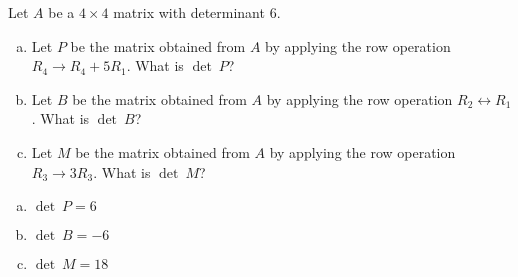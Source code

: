 
\begin{exerciseStatement}


Let \(A\) be a \(4 \times 4\) matrix with determinant \( 6 \).


\begin{enumerate}[(a)]
\item Let \(P\) be the matrix obtained from \(A\) by applying the row operation \( R_4 \to R_4 + 5R_1 \). What is \(\operatorname{det}\ P\)?
\item Let \(B\) be the matrix obtained from \(A\) by applying the row operation \( R_2 \leftrightarrow R_1 \). What is \(\operatorname{det}\ B\)?
\item Let \(M\) be the matrix obtained from \(A\) by applying the row operation \( R_3 \to 3R_3 \). What is \(\operatorname{det}\ M\)?
\end{enumerate}
    
\end{exerciseStatement}
    
\begin{exerciseAnswer} 

\begin{enumerate}[(a)]
\item \(\operatorname{det}\ P= 6 \)
\item \(\operatorname{det}\ B= -6 \)
\item \(\operatorname{det}\ M= 18 \)
\end{enumerate}
    
\end{exerciseAnswer}
    
